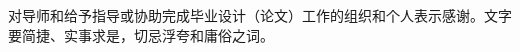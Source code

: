 \begin{acknowledgement}
对导师和给予指导或协助完成毕业设计（论文）工作的组织和个人表示感谢。文字要简捷、实事求是，切忌浮夸和庸俗之词。 
\end{acknowledgement}
